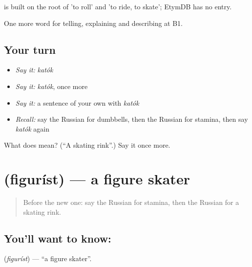 \begin{cousinweb}
\emph{} is built on the root of \emph{} 'to roll' and \emph{} 'to ride, to skate'; EtymDB has no entry.
\end{cousinweb}

\begin{grammarlens}[title={What you've built}]
One more word for telling, explaining and describing at B1.
\end{grammarlens}

\subsection*{Your turn}
\begin{itemize}
\raggedright
  \item \emph{Say it:} \emph{katók}
  \item \emph{Say it:} \emph{katók}, once more
  \item \emph{Say it:} a sentence of your own with \emph{katók}
  \item \emph{Recall:} say the Russian for dumbbells, then the Russian for stamina, then say \emph{katók} again
\end{itemize}

\begin{tcolorbox}[breakable,colback=teal!4,colframe=teal!35!black,title={Before you move on}]
What does  mean? (\textquotedblleft{}A skating rink\textquotedblright{}.) Say it once more.
\end{tcolorbox}
\section[\texorpdfstring{\ru{фигурист} (figuríst)}{фигурист (figuríst)}]{ (figuríst) — a figure skater}

\label{lesson:RU-C514-figurist}



\begin{quote}
Before the new one: say the Russian for stamina, then the Russian for a skating rink.
\end{quote}

\subsection*{You'll want to know: }
\textbf{} (\emph{figuríst}) — \textquotedblleft{}a figure skater\textquotedblright{}.

